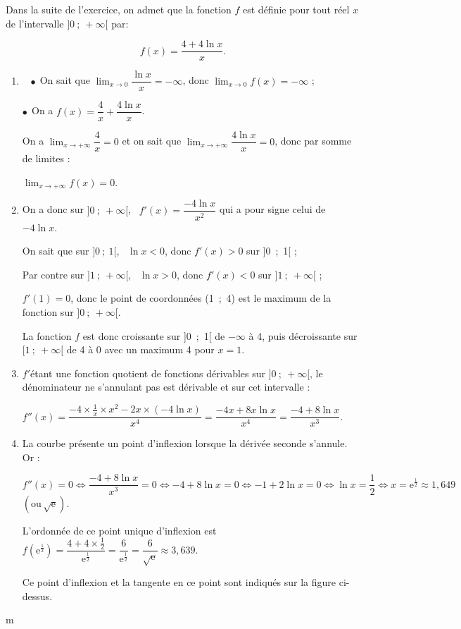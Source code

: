 \documentclass[10pt]{article}
\begin{document}
Dans la suite de l'exercice, on admet que la fonction $f$ est définie pour tout réel $x$ de l'intervalle $]0~;~ +\infty[$ par:

\[f(x) = \dfrac{4 + 4\ln x}{x}.\]

\begin{enumerate}[resume]
\item ~
$\bullet~~$On sait que $\displaystyle\lim_{x \to 0} \dfrac{\ln x}{x} = - \infty$, donc 
$\displaystyle\lim_{x \to 0} f(x) = - \infty$ ;

$\bullet~~$On a $f(x) = \dfrac{4}{x} + \dfrac{4\ln x}{x}$.

On a $\displaystyle\lim_{x \to + \infty}\dfrac{4}{x} = 0$ et on sait que $\displaystyle\lim_{x \to + \infty}\dfrac{4\ln x}{x} = 0$, donc par somme de limites : 

$\displaystyle\lim_{x \to + \infty}f(x) = 0$.
\item 
On a donc sur $]0~;~+ \infty[$, \, $f'(x) = \dfrac{-4\ln x}{x^2}$ qui a pour signe celui de $-4\ln x$.

On sait que sur $]0~;~1[$, \, $\ln x < 0$, donc $f'(x) > 0$ sur ]0~;~1[ ;

Par contre sur $]1~;~+ \infty[$, \, $\ln x > 0$, donc $f'(x) < 0$ sur $]1~;~+ \infty[$ ;

$f'(1) = 0$, donc le point de coordonnées (1~;~4) est le maximum de la fonction sur $]0~;~+ \infty[$.

La fonction $f$ est donc croissante sur ]0~;~1[ de $- \infty$ à 4, puis décroissante sur $[1~;~+ \infty[$ de 4 à 0 avec un maximum 4 pour $x = 1$.
\item 
$f'$étant une fonction quotient de fonctions dérivables sur $]0~;~+ \infty[$, le dénominateur ne s'annulant pas est dérivable et sur cet intervalle :

$f''(x) = \dfrac{-4 \times \frac{1}{x} \times x^2 - 2x \times (- 4\ln x)}{x^4} = \dfrac{- 4x + 8x\ln x}{x^4} = \dfrac{- 4 + 8\ln x}{x^3}.$

\item 
La courbe présente un point d'inflexion lorsque la dérivée seconde s'annule. Or :

$f''(x) = 0 \iff \dfrac{- 4 + 8\ln x}{x^3} = 0 \iff - 4 + 8\ln x = 0 \iff -1 + 2\ln x= 0 \iff \ln x= \dfrac{1}{2} \iff x = \text{e}^{\frac{1}{2}} \approx 1,649$ $\left(\text{ou}\, \sqrt{\text{e}} \right)$.

L'ordonnée de ce point unique d'inflexion est $f\left(\text{e}^{\frac{1}{2}}\right) = \dfrac{4 + 4\times \frac{1}{2}}{\text{e}^{\frac{1}{2}}} = \dfrac{6}{\text{e}^{\frac{1}{2}}} = \dfrac{6} {\sqrt{\text{e}}} \approx 3,639$.

Ce point d'inflexion et la tangente en ce point sont indiqués sur la figure ci-dessus.
\end{enumerate}

\begin{center}{\fontsize{18}{18}\selectfont m} 


\end{center}
\end{document}
